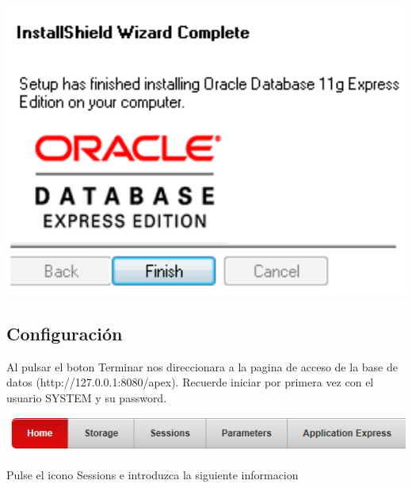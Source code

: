 \documentclass[12pt,letterpaper]{article}
\begin{document}
\begin{center}
\includegraphics[width=15cm]{./IMG/img29}
\end{center}

\subsection{Configuraci\'on}

Al pulsar el boton Terminar nos direccionara a la pagina de acceso de la base de datos (http://127.0.0.1:8080/apex). Recuerde iniciar por primera vez con el usuario SYSTEM y su password.
\begin{center}
\includegraphics[width=15cm]{./IMG/img30}
\end{center}
Pulse el icono Sessions e introduzca la siguiente informacion
\end{document}
